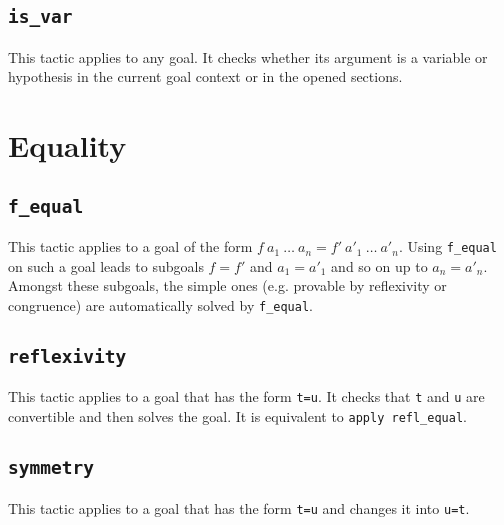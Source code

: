 \begin{coq_example*}
\ErrMsg {}

\subsection{\tt is\_var \term}
\label{isvar}

This tactic applies to any goal. It checks whether its argument is a
variable or hypothesis in the current goal context or in the opened sections.

\ErrMsg {}

\section{Equality}

\subsection{\tt f\_equal}
\label{f-equal}

This tactic applies to a goal of the form $f\ a_1\ \ldots\ a_n = f'\
a'_1\ \ldots\ a'_n$. Using {\tt f\_equal} on such a goal leads to
subgoals $f=f'$ and $a_1=a'_1$ and so on up to $a_n=a'_n$. Amongst
these subgoals, the simple ones (e.g. provable by
reflexivity or congruence) are automatically solved by {\tt f\_equal}.

\subsection{\tt reflexivity}
\label{reflexivity}

This tactic applies to a goal that has the form {\tt t=u}. It checks
that {\tt t} and {\tt u} are convertible and then solves the goal.
It is equivalent to {\tt apply refl\_equal}.

\begin{ErrMsgs}
\item {}
\item {}
\end{ErrMsgs}

\subsection{\tt symmetry}

This tactic applies to a goal that has the form {\tt t=u} and changes it
into {\tt u=t}.


\end{coq_example*}
